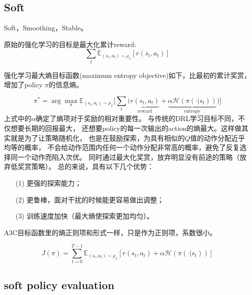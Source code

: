 \subsection{Soft}

Soft，Smoothing，Stable。

原始的强化学习的目标是最大化累计reward:
\begin{equation}\label{rl_objective_function}
\sum_t\mathbb{E}_{(s_t,a_t)\sim\rho_\pi}\left[r(s_t, a_t)\right]
\end{equation}

强化学习最大熵目标函数(maximum entropy objective)如下，比最初的累计奖赏，
增加了policy $\pi$的信息熵。

\begin{equation}\label{maximum_entropy_objective}
\pi^* = \arg\max_\pi \mathbb{E}_{(s_t,a_t)\sim\rho_\pi}
\Big[ \sum_t \big(
\underbrace{r(s_t, a_t)}_{\text{reward}} + 
\underbrace{\alpha \mathcal{H}(\pi(\cdot | s_t))}_{\text{entropy}}
\big)\Big]
\end{equation}
上式中的$\alpha$确定了熵项对于奖励的相对重要性。
与传统的DRL学习目标不同，不仅想要长期的回报最大，
还想要policy的每一次输出的action的熵最大。这样做其实就是为了让策略随机化，
也是在鼓励探索，为具有相似的$Q$值的动作分配近乎均等的概率，
不会给动作范围内任何一个动作分配非常高的概率，避免了反复选择同一个动作而陷入次优。
同时通过最大化奖赏，放弃明显没有前途的策略（放弃低奖赏策略）。
总的来说，具有以下几个优势：
\begin{itemize}
\setlength{\parskip}{0pt}
\item[(1)]
更强的探索能力；
\item[(2)]
更鲁棒，面对干扰的时候能更容易做出调整；
\item[(3)]
训练速度加快（最大熵使探索更加均匀）。
\end{itemize}

A3C目标函数里的熵正则项和形式一样，只是作为正则项，系数很小。

\begin{equation}\label{entropy_of_policy}
J(\pi) = \sum_{t=0}^{T-1} \mathbb{E}_{(s_t,a_t)\sim\rho_\pi}
[r(s_t, a_t) + \alpha \mathcal{H}(\pi(\cdot | s_t))]
\end{equation}


\subsection{soft policy evaluation}

\cite{YZhang2020}
\parencite{YZhang2020}


